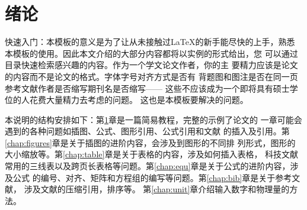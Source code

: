 \chapter{绪论}
\label{chap:introduction}

快速入门：本模板的意义是为了让从未接触过\LaTeX 的新手能尽快的上手，熟悉
本模板的使用。因此本文介绍的大部分内容都将以实例的形式给出，您
可以通过目录快速检索感兴趣的内容。作为一个学文论文作者，你的主
要精力应该是论文的内容而不是论文的格式。字体字号对齐方式是否有
背题图和图注是否在同一页参考文献作者是否缩写期刊名是否缩写——
这些不应该成为一个即将具有硕士学位的人花费大量精力去考虑的问题。
这也是本模板要解决的问题。

本说明的结构安排如下：第\ref{chap:introduction}章是一篇简易教程，完整的示例了论文的
一章可能会遇到的各种问题如插图、公式、图形引用、公式引用和文献
的插入及引用。第\ref{chap:figures}章是关于插图的进阶内容，会涉及到图形的不同排
列形式，图形的大小缩放等。第\ref{chap:table}章是关于表格的内容，涉及如何插入表格，
科技文献常用的三线表以及跨页长表格等问题。第\ref{chap:equ}章是关于公式的进阶内容，涉及公式
的编号、对齐、矩阵和方程组的编写等问题。第\ref{chap:bib}章是关于参考文献，
涉及文献的压缩引用，排序等。%
第\ref{chap:unit}章介绍输入数字和物理量的方法。


